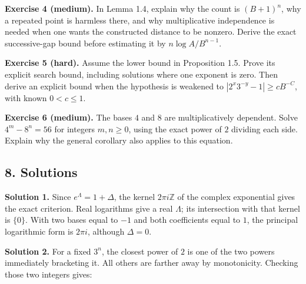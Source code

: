 \documentclass[
  11pt,
  a4paper,
]{article}
\begin{document}
\textbf{Exercise 4 (medium).} In Lemma 1.4, explain why the count is
\((B+1)^n\), why a repeated point is harmless there, and why
multiplicative independence is needed when one wants the constructed
distance to be nonzero. Derive the exact successive-gap bound before
estimating it by \(n\log A/B^{n-1}\).

\textbf{Exercise 5 (hard).} Assume the lower bound in Proposition 1.5.
Prove its explicit search bound, including solutions where one exponent
is zero. Then derive an explicit bound when the hypothesis is weakened
to \(|2^x3^{-y}-1|\ge cB^{-C}\), with known \(0<c\le1\).

\textbf{Exercise 6 (medium).} The bases \(4\) and \(8\) are
multiplicatively dependent. Solve \(4^m-8^n=56\) for integers
\(m,n\ge0\), using the exact power of \(2\) dividing each side. Explain
why the general corollary also applies to this equation.

\subsection{8. Solutions}\label{solutions}

\textbf{Solution 1.} Since \(e^\Lambda=1+\Delta\), the kernel
\(2\pi i\mathbb Z\) of the complex exponential gives the exact
criterion. Real logarithms give a real \(\Lambda\); its intersection
with that kernel is \(\{0\}\). With two bases equal to \(-1\) and both
coefficients equal to \(1\), the principal logarithmic form is
\(2\pi i\), although \(\Delta=0\).

\textbf{Solution 2.} For a fixed \(3^n\), the closest power of \(2\) is
one of the two powers immediately bracketing it. All others are farther
away by monotonicity. Checking those two integers gives:
\end{document}
